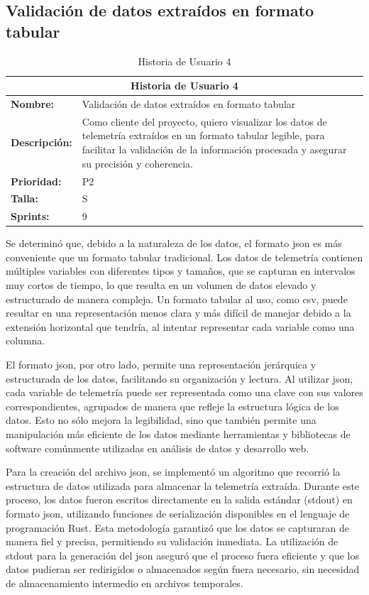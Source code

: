 \subsection{Validación de datos extraídos en formato tabular}
\begin{table}[H]
\centering
\begin{tabular}{|l|p{10cm}|}
\hline
\multicolumn{2}{|c|}{\textbf{Historia de Usuario 4}} \\ \hline
\textbf{Nombre:} & Validación de datos extraídos en formato tabular \\ \hline
\textbf{Descripción:} & Como cliente del proyecto, quiero visualizar los datos de telemetría extraídos en un formato tabular legible, para facilitar la validación de la información procesada y asegurar su precisión y coherencia. \\ \hline
\textbf{Prioridad:} & P2 \\ \hline
\textbf{Talla:} & S \\ \hline
\textbf{Sprints:} & 9 \\ \hline
\end{tabular}
\caption{Historia de Usuario 4}
\label{tab:us_visualizacion_basica}
\end{table}

Se determinó que, debido a la naturaleza de los datos, el formato \ac{json} es más conveniente que un formato tabular tradicional. Los datos de telemetría contienen múltiples variables con diferentes tipos y tamaños, que se capturan en intervalos muy cortos de tiempo, lo que resulta en un volumen de datos elevado y estructurado de manera compleja. Un formato tabular al uso, como  \ac{csv}, puede resultar en una representación menos clara y más difícil de manejar debido a la extensión horizontal que tendría, al intentar representar cada variable como una columna.

El formato \ac{json}, por otro lado, permite una representación jerárquica y estructurada de los datos, facilitando su organización y lectura. Al utilizar \ac{json}, cada variable de telemetría puede ser representada como una clave con sus valores correspondientes, agrupados de manera que refleje la estructura lógica de los datos. Esto no sólo mejora la legibilidad, sino que también permite una manipulación más eficiente de los datos mediante herramientas y bibliotecas de software comúnmente utilizadas en análisis de datos y desarrollo web.

Para la creación del archivo \ac{json}, se implementó un algoritmo que recorrió la estructura de datos utilizada para almacenar la telemetría extraída. Durante este proceso, los datos fueron escritos directamente en la salida estándar (stdout) en formato \ac{json}, utilizando funciones de serialización disponibles en el lenguaje de programación Rust. Esta metodología garantizó que los datos se capturaran de manera fiel y precisa, permitiendo su validación inmediata. La utilización de stdout para la generación del \ac{json} aseguró que el proceso fuera eficiente y que los datos pudieran ser redirigidos o almacenados según fuera necesario, sin necesidad de almacenamiento intermedio en archivos temporales.

